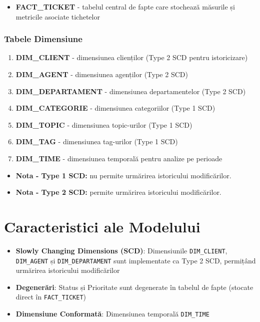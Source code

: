 \begin{itemize}
    \item \textbf{FACT\_TICKET} - tabelul central de fapte care stochează măsurile și metricile asociate tichetelor
\end{itemize}

\subsubsection{Tabele Dimensiune}

\begin{enumerate}
    \item \textbf{DIM\_CLIENT} - dimensiunea clienților (Type 2 SCD pentru istoricizare)
    \item \textbf{DIM\_AGENT} - dimensiunea agenților (Type 2 SCD)
    \item \textbf{DIM\_DEPARTAMENT} - dimensiunea departamentelor (Type 2 SCD)
    \item \textbf{DIM\_CATEGORIE} - dimensiunea categoriilor (Type 1 SCD)
    \item \textbf{DIM\_TOPIC} - dimensiunea topic-urilor (Type 1 SCD)
    \item \textbf{DIM\_TAG} - dimensiunea tag-urilor (Type 1 SCD)
    \item \textbf{DIM\_TIME} - dimensiunea temporală pentru analize pe perioade
\end{enumerate}

\begin{itemize}
    \item \textbf{Nota - Type 1 SCD:} nu permite urmărirea istoricului modificărilor.
    \item \textbf{Nota - Type 2 SCD:} permite urmărirea istoricului modificărilor.
\end{itemize}

\section{Caracteristici ale Modelului}

\begin{itemize}
    \item \textbf{Slowly Changing Dimensions (SCD)}: Dimensiunile \texttt{DIM\_CLIENT}, \texttt{DIM\_AGENT} și \texttt{DIM\_DEPARTAMENT} sunt implementate ca Type 2 SCD, permițând urmărirea istoricului modificărilor
    \item \textbf{Degenerări}: Status și Prioritate sunt degenerate în tabelul de fapte (stocate direct în \texttt{FACT\_TICKET})
    \item \textbf{Dimensiune Conformată}: Dimensiunea temporală \texttt{DIM\_TIME}
\end{itemize}

